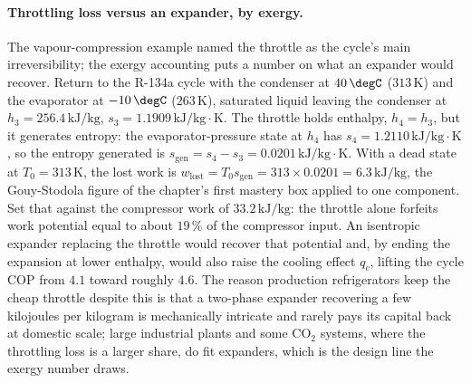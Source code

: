 \paragraph{Throttling loss versus an expander, by exergy.} The vapour-compression
example named the throttle as the cycle's main irreversibility; the exergy
accounting puts a number on what an expander would recover. Return to the R-134a
cycle with the condenser at $40\,\degC$ ($313\,\si{\kelvin}$) and the evaporator
at $-10\,\degC$ ($263\,\si{\kelvin}$), saturated liquid leaving the condenser at
$h_3 = 256.4\,\text{kJ}/\text{kg}$, $s_3 = 1.1909\,\text{kJ}/\text{kg}\cdot\text{K}$.
The throttle holds enthalpy, $h_4 = h_3$, but it generates entropy: the
evaporator-pressure state at $h_4$ has $s_4 = 1.2110\,\text{kJ}/\text{kg}\cdot
\text{K}$, so the entropy generated is $s_{\text{gen}} = s_4 - s_3 = 0.0201\,
\text{kJ}/\text{kg}\cdot\text{K}$. With a dead state at $T_0 = 313\,\si{\kelvin}$,
the lost work is $w_{\text{lost}} = T_0 s_{\text{gen}} = 313 \times 0.0201 =
6.3\,\text{kJ}/\text{kg}$, the Gouy-Stodola figure of the chapter's first mastery
box applied to one component. Set that against the compressor work of $33.2\,
\text{kJ}/\text{kg}$: the throttle alone forfeits work potential equal to about
$19\,\%$ of the compressor input. An isentropic expander replacing the throttle
would recover that potential and, by ending the expansion at lower enthalpy,
would also raise the cooling effect $q_c$, lifting the cycle COP from $4.1$
toward roughly $4.6$. The reason production refrigerators keep the cheap throttle
despite this is that a two-phase expander recovering a few kilojoules per kilogram
is mechanically intricate and rarely pays its capital back at domestic scale;
large industrial plants and some CO$_2$ systems, where the throttling loss is a
larger share, do fit expanders, which is the design line the exergy number draws.

